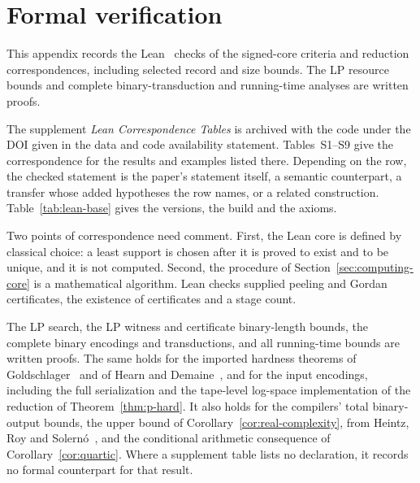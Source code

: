 
\section{Formal verification}\label{app:verification}

This appendix records the Lean~\cite{lean4,mathlib} checks of the
signed-core criteria and reduction correspondences, including selected
record and size bounds. The LP resource bounds and complete
binary-transduction and running-time analyses are written proofs.

The supplement \emph{Lean Correspondence Tables} is archived with the
code under the DOI given in the data and code availability
statement. Tables~S1--S9 give the correspondence for the results and
examples listed there. Depending on the row, the checked statement is the
paper's statement itself, a semantic counterpart, a transfer whose added
hypotheses the row names, or a related construction. Table~\ref{tab:lean-base}
gives the versions, the build and the axioms.

Two points of correspondence need comment. First, the Lean core is defined
by classical choice: a least support is chosen after it is proved to exist
and to be unique, and it is not computed. Second, the procedure of
Section~\ref{sec:computing-core} is a mathematical algorithm.
Lean checks supplied peeling and Gordan certificates, the existence of certificates and
a stage count.

The LP search, the LP witness and certificate binary-length bounds, the
complete binary encodings and transductions, and all running-time bounds
are written proofs. The same holds for the imported
hardness theorems of Goldschlager~\cite{goldschlager} and of Hearn and
Demaine~\cite{hearndemaine}, and for the input encodings, including the
full serialization and the tape-level log-space implementation of the
reduction of Theorem~\ref{thm:p-hard}. It also holds for the compilers'
total binary-output bounds, the upper bound of
Corollary~\ref{cor:real-complexity}, from Heintz, Roy and
Solern\'o~\cite{heintzroysolerno1994components}, and the conditional
arithmetic consequence of Corollary~\ref{cor:quartic}. Where a supplement table lists
no declaration, it records no formal counterpart for that result.

\DeclareUrlCommand{}
\newcommand{\lc}{\raggedright\let\\\tabularnewline\hspace{0pt}}
\newcommand{\leanrow}{\addlinespace[2pt]}
\newcommand{\leanhead}{%
  \toprule
  \lc Result & \lc Lean declarations, by file & \lc What Lean checks & \lc Proved only on paper\\
  \midrule}


